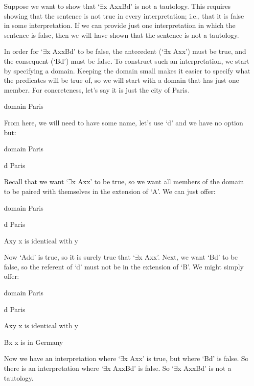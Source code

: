 Suppose we want to show that ‘$\exists$x Axx\eif Bd’ is not a tautology. This requires showing that the sentence is not true in every interpretation; i.e., that it is false in some interpretation. If we can provide just one interpretation in which the sentence is false, then we will have shown that the sentence is not a tautology.

In order for ‘$\exists$x Axx\eif Bd’ to be false, the antecedent (‘$\exists$x Axx’) must be true, and the consequent (‘Bd’) must be false. To construct such an interpretation, we start by specifying a domain. Keeping the domain small makes it easier to specify what the predicates will be true of, so we will start with a domain that has just one member. For concreteness, let’s say it is just the city of Paris.

\begin{ekey}\item[domain]  Paris
\end{ekey}
From here, we will need to have some name, let's use ‘d’ and we have no option but:

\begin{ekey}\item[domain]  Paris
\item[d] Paris
\end{ekey}
Recall that we want ‘$\exists$x Axx’ to be true, so we want all members of the domain to be paired with themselves in the extension of ‘A’. We can just offer:

\begin{ekey}\item[domain]  Paris
\item[d] Paris
\item[Axy] x is identical with y
\end{ekey}
Now ‘Add’ is true, so it is surely true that ‘$\exists$x Axx’. Next, we want ‘Bd’ to be false, so the referent of ‘d’ must not be in the extension of ‘B’. We might simply offer:

\begin{ekey}\item[domain]  Paris
\item[d] Paris
\item[Axy] x is identical with y
\item[Bx] x is in Germany
\end{ekey}
Now we have an interpretation where ‘$\exists$x Axx’ is true, but where ‘Bd’ is false. So there is an interpretation where ‘$\exists$x Axx\eif Bd’ is false. So ‘$\exists$x Axx\eif Bd’ is not a tautology.

